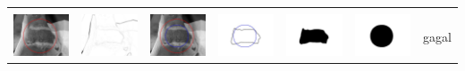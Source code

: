 \begin{table}[H]
\begin{tabular}{|m{0.7in}|m{0.7in}|m{0.7in}|m{0.7in}|m{0.7in}|m{0.7in}|m{0.7in}|}
		&  &  & & & &  \\
		\includegraphics[width=0.7in]{dataset/dataset_3/luka_merah/ready/12_integer_init.jpg}&
		\includegraphics[width=0.7in]{dataset/dataset_3/luka_merah/ready/12_integer_ext.jpg}&
		\includegraphics[width=0.7in]{dataset/dataset_3/luka_merah/ready/12_integer_result.jpg}&
		\includegraphics[width=0.7in]{dataset/dataset_3/luka_merah/ready/12_gt_r_integer.jpg}&
		\includegraphics[width=0.7in]{dataset/dataset_3/luka_merah/ready/12_r.jpg}&
		\includegraphics[width=0.7in]{dataset/dataset_3/luka_merah/ready/12_integer_r.jpg}&
		gagal\\
		\hline
		

\end{tabular}
\end{table}
